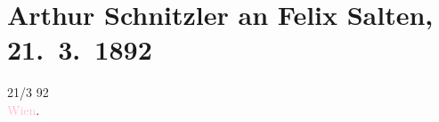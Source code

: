 

\renewcommand{\erwaehntePersonen}{Personen: Stefan George, Max Henze, Hugo von Hofmannsthal,  Jesus, Felix Salten, Gustav Schwarzkopf}
\renewcommand{\erwaehnteInstitutionen}{Institutionen: Allgemeine Theater-Revue für Bühne und Welt. Illustrierte Halbmonatsschrift, Heinrich Minden}
\renewcommand{\erwaehnteOrte}{Orte: Berlin, Café Central, Dresden, Leipzig, Wien}
\renewcommand{\erwaehnteWerke}{Werke: Blätter für die Kunst, Der Tod des Tizian. Ein Bruchstück, Die Bilanz der Ehe. Novellistische Studien. 2 Bde., Vielfarbige Distichen V.}
\section[Arthur Schnitzler an Felix Salten, 21. 3. 1892]{Arthur Schnitzler an Felix Salten, 21. 3. 1892}
\nopagebreak{}
\rehead{ }\normalsize\beginnumbering{}
\toendnotes[C]{\smallbreak\pagebreak[2]}
\toendnotes[C]{\smallbreak}
\pstart
           \raggedleft{}{\pb}21/3 92{\\}\textcolor{pink}{Wien}{}\ledrightnote{\textcolor{pink}{Wien}}.\pend
           
